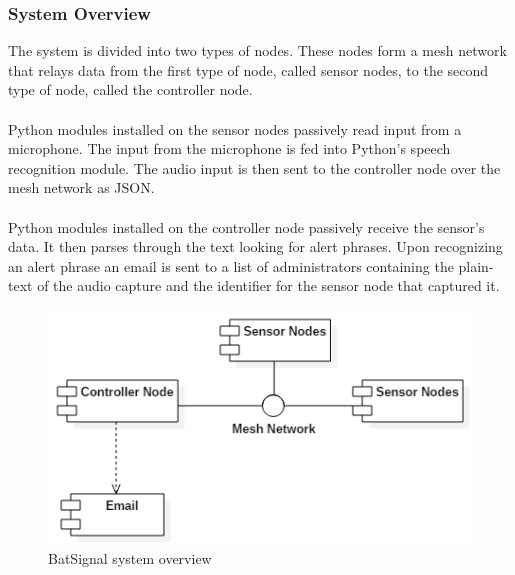 \documentclass[11pt,a4paper]{article}
\begin{document}
\subsubsection{System Overview}
The system is divided into two types of nodes.  These nodes form a mesh network that relays data from the first type of node, called sensor nodes, to the second type of node, called the controller node. \\\\
Python modules installed on the sensor nodes passively read input from a microphone. The input from the microphone is fed into Python's speech recognition module. The audio input is then sent to the controller node over the mesh network as JSON. \\\\
Python modules installed on the controller node passively receive the sensor's data.  It then parses through the text looking for alert phrases.  Upon recognizing an alert phrase an email is sent to a list of administrators containing the plain-text of the audio capture and the identifier for the sensor node that captured it.
\begin{figure}[H]
	\centering
		\includegraphics[scale=0.75, keepaspectratio=true]{Graphics/SimpleOverview.png}
	\caption{BatSignal system overview}
\end{figure}
\end{document}
